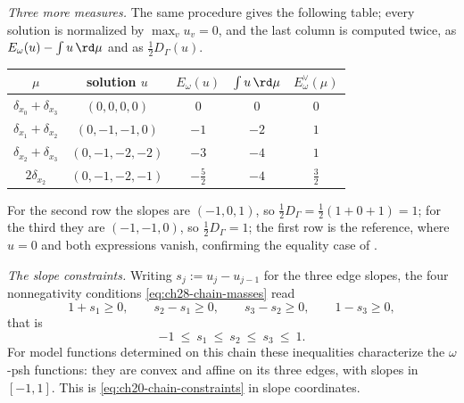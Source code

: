 \begin{example}[{The chain $\Gamma=[0,3]$: a solved equation, verified}]
\emph{Three more measures.}  The same procedure gives the following table;
every solution is normalized by $\max_vu_v=0$, and the last column is
computed twice, as $E_\omega(u)-\int u\,\rd\mu$ and as
$\tfrac12D_\Gamma(u)$.
\begin{center}
\small
\begin{tabular}{c|c|c|c|c}
\toprule
$\mu$&solution $u$&$E_\omega(u)$&$\int u\,\rd\mu$
 &$E^\vee_\omega(\mu)$\\
\midrule
$\delta_{x_0}+\delta_{x_3}$&$(0,0,0,0)$&$0$&$0$&$0$\\
$\delta_{x_1}+\delta_{x_2}$&$(0,-1,-1,0)$&$-1$&$-2$&$1$\\
$\delta_{x_2}+\delta_{x_3}$&$(0,-1,-2,-2)$&$-3$&$-4$&$1$\\
$2\delta_{x_2}$&$(0,-1,-2,-1)$&$-\tfrac52$&$-4$&$\tfrac32$\\
\bottomrule
\end{tabular}
\end{center}
For the second row the slopes are $(-1,0,1)$, so
$\tfrac12D_\Gamma=\tfrac12(1+0+1)=1$; for the third they are
$(-1,-1,0)$, so $\tfrac12D_\Gamma=1$; the first row is the reference,
where $u=0$ and both expressions vanish, confirming the equality case of
.

\emph{The slope constraints.}  Writing $s_j:=u_j-u_{j-1}$ for the three
edge slopes, the four nonnegativity conditions
\eqref{eq:ch28-chain-masses} read
\[
 1+s_1\geq0,\qquad s_2-s_1\geq0,\qquad s_3-s_2\geq0,\qquad 1-s_3\geq0 ,
\]
that is
\begin{equation}
\label{eq:ch28-chain-slope-window}
 -1\ \leq\ s_1\ \leq\ s_2\ \leq\ s_3\ \leq\ 1 .
\end{equation}
For model functions determined on this chain these inequalities
characterize the $\omega$-psh functions: they are convex and affine on
its three edges, with slopes in $[-1,1]$.  This is
\eqref{eq:ch20-chain-constraints} in slope coordinates.


\end{example}
